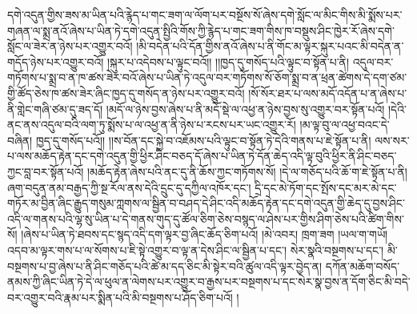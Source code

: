 དགེ་འདུན་གྱིས་ཟས་མ་ཡིན་པའི་རྙེད་པ་གང་ཟག་ལ་ལོག་པར་བསྔོས་སོ་ཞེས་དགེ་སློང་ལ་མིང་གིས་མི་སྨོས་པར་གཞན་ལ་སྨྲ་ནའོ་ཞེས་པ་ཡིན་ཏེ་དགེ་འདུན་སྤྱིའི་གོས་ཀྱི་རྙེད་པ་གང་ཟག་གིས་ཁ་བསྡུས་ཤིང་ཁྱེར་རོ་ཞེས་དགེ་སློང་ལ་ཟེར་ན་ཉེས་པར་འགྱུར་བའོ། །མི་བདེན་པའི་དོན་གྱིས་ནའོ་ཞེས་པ་ནི་གོང་མ་ལྟར་སྐུར་པའང་མི་བདེན་ན་གདོད་ཉེས་པར་འགྱུར་བའོ། །སྐུར་པ་འདེབས་པ་ལྟུང་བའོ།། །།ཁྱད་དུ་གསོད་པའི་ལྟུང་བ་སྟོན་པ་ནི། འདུལ་བར་གཏོགས་པ་སྨྲ་བ་ན་ཁ་ཚས་ཟེར་བའོ་ཞེས་པ་ཡིན་ཏེ་འདུལ་བར་གཏོགས་སོ་ཅོག་སྨྲ་བ་ན་ཕྲན་ཚེགས་དེ་དག་ཙམ་གྱི་ཚོད་ཅེས་ཁ་ཚས་ཟེར་ཞིང་ཁྱད་དུ་གསོད་ན་ཉེས་པར་འགྱུར་བའོ། །སོ་སོར་ཐར་པ་ལས་མདོ་འདོན་པ་ན་ཞེས་པ་ནི་གླེང་གཞི་ཙམ་དུ་ཟད་དོ། །མདོ་ལ་ཉེས་བྱས་ཞེས་པ་ནི་མདོ་སྡེ་ལ་འཕྱ་ན་ཉེས་བྱས་སུ་འགྱུར་བར་སྟོན་པའོ། །དེའི་ནང་ནས་འདུལ་བའི་ལག་ཏུ་སྨོས་པ་ལ་འཕྱ་ན་ནི་ཉེས་པ་རངས་པར་ཡང་འགྱུར་རོ། །མ་ལྟ་བུ་ལ་འཕྱ་བའང་དེ་བཞིན། ཁྱད་དུ་གསོད་པའོ།། །།ས་བོན་དང་སྐྱེ་བ་འཇོམས་པའི་ལྟུང་བ་སྟོན་ཏེ་དེའི་གནས་པ་ཇེ་སྟོན་པ་ནི། ལས་སར་པ་ལས་མཆོད་རྟེན་དང་དགེ་འདུན་གྱི་ཕྱིར་ཤིང་བཅད་དོ་ཞེས་པ་ཡིན་ཏེ་དོན་ཆེད་འདི་ལྟ་བུའི་ཕྱིར་ནི་ཤིང་བཅད་ཀྱང་བླ་བར་སྟོན་པའོ། །མཆོད་རྟེན་ཞེས་པའི་ནང་དུ་ནི་ཆོས་ཀྱང་གཏོགས་སོ། །དེ་ལ་གཅོད་པའི་ཆོ་ག་ཇེ་སྟོན་པ་ནི། ཞག་བདུན་ནམ་བརྒྱད་ཀྱི་སྔ་རོལ་ནས་དེའི་དྲུང་དུ་དཀྱིལ་འཁོར་དང་། དྲི་དང་མེ་ཏོག་དང་སྤོས་དང་མར་མེ་དང་གཏོར་མ་བྱིན་ཞིང་རྒྱུད་གསུམ་ཀླགས་ལ་སྦྱིན་བ་བཤད་དེ་ཤིང་འདི་མཆོད་རྟེན་དང་དགེ་འདུན་གྱི་ཆེད་དུ་བྱས་ཤིང་འདི་ལ་གནས་པའི་ལྷ་སུ་ཡིན་པ་དེ་གནས་གུད་དུ་ཚོལ་ཅིག་ཅེས་བསྙད་ལ་ཤེས་པར་གྱིས་ཤིག་ཅེས་པའི་ཚིག་གིས་སོ། །ཞེས་པ་ཡིན་ཏེ་ཐབས་དང་སྙད་འདི་དག་ལྟར་བྱ་ཞིང་ཆོད་ཅིག་པའོ། །མེ་འབར། ཁྲག་ཟག །ཡལ་ག་གཡོ། འདབ་མ་ལྟར་གས་པ་ལ་སོགས་པ་ཇི་སྟེ་འགྱུར་བ་ལྟ་ན་དེས་ཤིང་ལ་སྦྱིན་པ་དང་། སེར་སྣའི་བསྔགས་པ་དང་། མི་བསྔགས་པ་བྱ་ཞེས་པ་ནི་ཤིང་གཅོད་པའི་ཚེ་མ་དད་ཅིང་མི་སྟེར་བའི་ཚུལ་འདི་ལྟར་བྱེད་ན། དཀོན་མཆོག་བསོད་ནམས་ཀྱི་ཞིང་ཡིན་ཏེ་དེ་ལ་ཕུལ་ན་ལེགས་པར་འགྱུར་བ་རྒྱས་པར་བསྔགས་པ་དང་སེར་སྣ་བྱས་ན་དོག་ཅིང་མི་བདེ་བར་འགྱུར་བའི་རྣམ་པར་སྨིན་པའི་མི་བསྔགས་པ་ཤོད་ཅིག་པའོ། །

